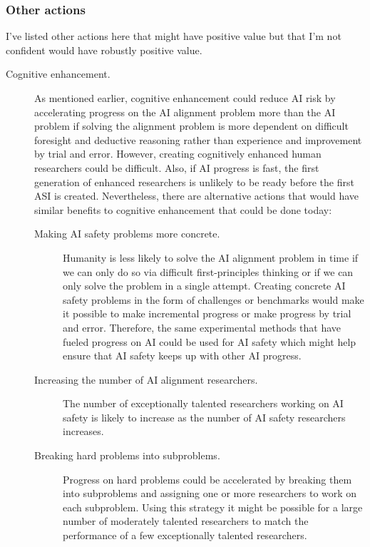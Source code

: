 \documentclass{article}
\begin{document}
\subsubsection{Other actions}

I’ve listed other actions here that might have positive value but that I’m not confident would have robustly positive value.

\begin{description}
    \item[Cognitive enhancement.] As mentioned earlier, cognitive enhancement could reduce AI risk by accelerating progress on the AI alignment problem more than the AI problem if solving the alignment problem is more dependent on difficult foresight and deductive reasoning rather than experience and improvement by trial and error. However, creating cognitively enhanced human researchers could be difficult. Also, if AI progress is fast, the first generation of enhanced researchers is unlikely to be ready before the first ASI is created. Nevertheless, there are alternative actions that would have similar benefits to cognitive enhancement that could be done today:
    \begin{description}
        \item[Making AI safety problems more concrete.] Humanity is less likely to solve the AI alignment problem in time if we can only do so via difficult first-principles thinking or if we can only solve the problem in a single attempt. Creating concrete AI safety problems in the form of challenges or benchmarks would make it possible to make incremental progress or make progress by trial and error. Therefore, the same experimental methods that have fueled progress on AI could be used for AI safety which might help ensure that AI safety keeps up with other AI progress.
        \item[Increasing the number of AI alignment researchers.] The number of exceptionally talented researchers working on AI safety is likely to increase as the number of AI safety researchers increases.
        \item[Breaking hard problems into subproblems.] Progress on hard problems could be accelerated by breaking them into subproblems and assigning one or more researchers to work on each subproblem. Using this strategy it might be possible for a large number of moderately talented researchers to match the performance of a few exceptionally talented researchers.
    \end{description}

\end{description}
\end{document}
